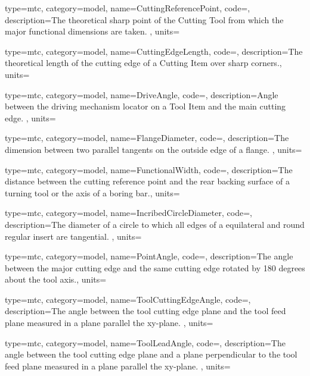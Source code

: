 {
  type=mtc,
  category=model,
  name={CuttingReferencePoint},
  code=,
  description={The theoretical sharp point of the Cutting Tool from which the major functional dimensions are taken. },
  units=
}


{
  type=mtc,
  category=model,
  name={CuttingEdgeLength},
  code=,
  description={The theoretical length of the cutting edge of a Cutting Item over sharp corners.},
  units=
}


{
  type=mtc,
  category=model,
  name={DriveAngle},
  code=,
  description={Angle between the driving mechanism locator on a Tool Item and the main cutting edge. },
  units=
}


{
  type=mtc,
  category=model,
  name={FlangeDiameter},
  code=,
  description={The dimension between two parallel tangents on the outside edge of a flange. },
  units=
}


{
  type=mtc,
  category=model,
  name={FunctionalWidth},
  code=,
  description={The distance between the cutting reference point and the rear backing surface of a turning tool or the axis of a boring bar.},
  units=
}


{
  type=mtc,
  category=model,
  name={IncribedCircleDiameter},
  code=,
  description={The diameter of a circle to which all edges of a equilateral and round regular insert are tangential. },
  units=
}


{
  type=mtc,
  category=model,
  name={PointAngle},
  code=,
  description={The angle between the major cutting edge and the same cutting edge rotated by 180 degrees about the tool axis.},
  units=
}


{
  type=mtc,
  category=model,
  name={ToolCuttingEdgeAngle},
  code=,
  description={The angle between the tool cutting edge plane and the tool feed plane measured in a plane parallel the xy-plane. },
  units=
}


{
  type=mtc,
  category=model,
  name={ToolLeadAngle},
  code=,
  description={The angle between the tool cutting edge plane and a plane perpendicular to the tool feed plane measured in a plane parallel the xy-plane. },
  units=
}


